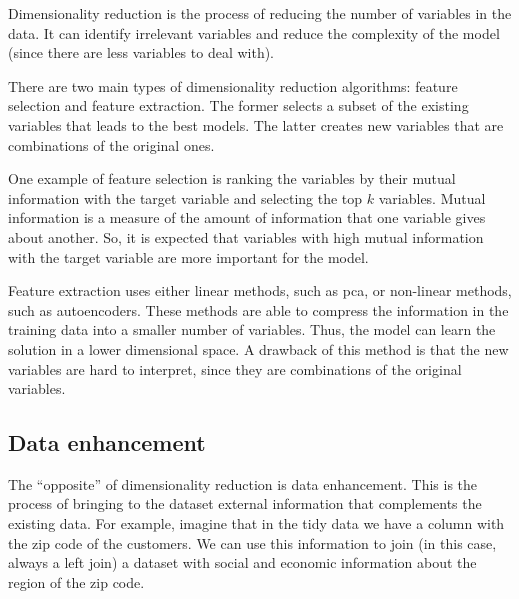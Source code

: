 Dimensionality reduction is the process of reducing the number of variables in the data.
It can identify irrelevant variables and reduce the complexity of the model (since there
are less variables to deal with).


There are two main types of dimensionality reduction algorithms: feature selection and
feature extraction.  The former selects a subset of the existing variables that leads
to the best models.  The latter creates new variables that are combinations
of the original ones.


One example of feature selection is ranking the variables by their mutual information with
the target variable and selecting the top $k$ variables.  Mutual information is a measure
of the amount of information that one variable gives about another.  So, it is expected
that variables with high mutual information with the target variable are more important
for the model.

Feature extraction uses either linear methods, such as \gls{pca}, or non-linear methods,
such as autoencoders.  These methods are able to compress the information in the training
data into a smaller number of variables.  Thus, the model can learn the solution in
a lower dimensional space.  A drawback of this method is that the new variables are
hard to interpret, since they are combinations of the original variables.

\subsection{Data enhancement}

The ``opposite'' of dimensionality reduction is data enhancement.  This is the process of
bringing to the dataset external information that complements the existing data.  For
example, imagine that in the tidy data we have a column with the zip code of the
customers.  We can use this information to join (in this case, always a left join) a
dataset with social and economic information about the region of the zip code.

